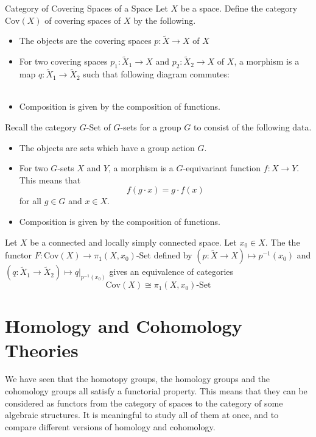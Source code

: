 \documentclass[a4paper]{article}
\begin{document}
\begin{defn}{Category of Covering Spaces of a Space}{} Let $X$ be a space. Define the category $\text{Cov}(X)$ of covering spaces of $X$ by the following. 
\begin{itemize}
\item The objects are the covering spaces $p:\tilde{X}\to X$ of $X$
\item For two covering spaces $p_1:\tilde{X}_1\to X$ and $p_2:\tilde{X}_2\to X$ of $X$, a morphism is a map $q:\tilde{X}_1\to\tilde{X}_2$ such that following diagram commutes: \\~\\
\item Composition is given by the composition of functions. 
\end{itemize}
\end{defn}

Recall the category $G\text{-Set}$ of $G$-sets for a group $G$ to consist of the following data. 
\begin{itemize}
\item The objects are sets which have a group action $G$. 
\item For two $G$-sets $X$ and $Y$, a morphism is a $G$-equivariant function $f:X\to Y$. This means that $$f(g\cdot x)=g\cdot f(x)$$ for all $g\in G$ and $x\in X$. 
\item Composition is given by the composition of functions. 
\end{itemize}

\begin{thm}{}{} Let $X$ be a connected and locally simply connected space. Let $x_0\in X$. The the functor $F:\text{Cov}(X)\to\pi_1(X,x_0)\text{-Set}$ defined by $\left(p:\tilde{X}\to X\right)\mapsto p^{-1}(x_0)$ and $\left(q:\tilde{X}_1\to\tilde{X}_2\right)\mapsto q|_{p^{-1}(x_0)}$ gives an equivalence of categories $$\text{Cov}(X)\cong\pi_1(X,x_0)\text{-Set}$$
\end{thm}

\pagebreak
\section{Homology and Cohomology Theories}
We have seen that the homotopy groups, the homology groups and the cohomology groups all satisfy a functorial property. This means that they can be considered as functors from the category of spaces to the category of some algebraic structures. It is meaningful to study all of them at once, and to compare different versions of homology and cohomology. \\~\\
\end{document}
